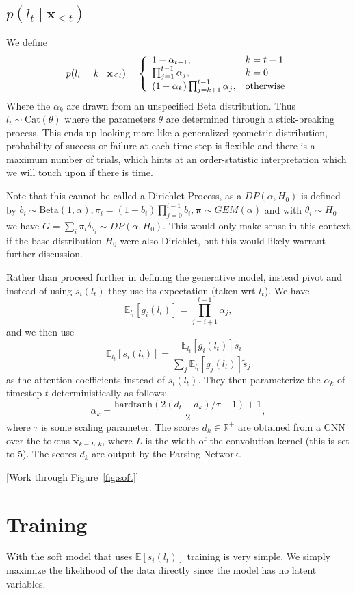\documentclass{article}
\newcommand{\Cat}{\mathrm{Cat}}
\newcommand\Betad{\mathrm{Beta}}
\newcommand\E[1]{\mathbb{E}\left[#1\right]}
\newcommand\Es[2]{\mathbb{E}_{#1}\left[#2\right]}
\newcommand{\bx}{\mathbf{x}}
\begin{document}
\subsection{$p(l_t\mid\bx_{\le t})$}
We define
\begin{equation*}
p(l_t=k\mid\bx_{\le t}) =\left\{\begin{array}{l l}
1-\alpha_{t-1}, & k=t-1\\
\prod_{j=1}^{t-1}\alpha_j, & k=0\\
(1-\alpha_k)\prod_{j=k+1}^{t-1}\alpha_j, & \textrm{otherwise}
\end{array}\right.
\end{equation*}
Where the $\alpha_k$ are drawn from an unspecified Beta distribution.
Thus $l_t\sim\Cat(\theta)$ where the parameters $\theta$ are determined
through a stick-breaking process. 
This ends up looking more like a generalized geometric distribution,
probability of success or failure at each time step is flexible and there is a 
maximum number of trials, which hints at an order-statistic interpretation which 
we will touch upon if there is time.

Note that this cannot be called a Dirichlet Process, as a $DP(\alpha, H_0)$ is defined by
$b_i\sim\Betad(1,\alpha),\pi_i=(1-b_i)\prod_{j=0}^{i-1}b_i,\bm{\pi}\sim GEM(\alpha)$
and with $\theta_i\sim H_0$ we have $G = \sum_i\pi_i\delta_{\theta_i}\sim DP(\alpha, H_0)$.
This would only make sense in this context if the base distribution $H_0$ were also Dirichlet,
but this would likely warrant further discussion.

Rather than proceed further in defining the generative model,
\citet{shen2018prpn} instead pivot and instead of using $s_i(l_t)$
they use its expectation (taken wrt $l_t$).
We have
$$
\Es{l_t}{g_i(l_t)} = \prod_{j=i+1}^{t-1}\alpha_j,
$$
and we then use
$$\Es{l_t}{s_i(l_t)} = \frac{\Es{l_t}{g_i(l_t)}\tilde{s}_i}{\sum_j\Es{l_t}{g_j(l_t)}\tilde{s}_j}$$
as the attention coefficients instead of $s_i(l_t)$.
They then parameterize the $\alpha_k$ of timestep $t$ deterministically as follows:
$$\alpha_k = \frac{\textrm{hardtanh}(2(d_t-d_k)/\tau+1)+1}{2},$$
where $\tau$ is some scaling parameter.
The scores $d_k\in\mathbb{R}^+$ are obtained from a CNN over the tokens $\bx_{k-L:k}$,
where $L$ is the width of the convolution kernel (this is set to 5).
The scores $d_k$ are output by the Parsing Network.

[Work through Figure~\ref{fig:soft}]

\section{Training}
With the soft model that uses $\E{s_i(l_t)}$ training is very simple.
We simply maximize the likelihood of the data directly since the model has no latent variables.
\end{document}

